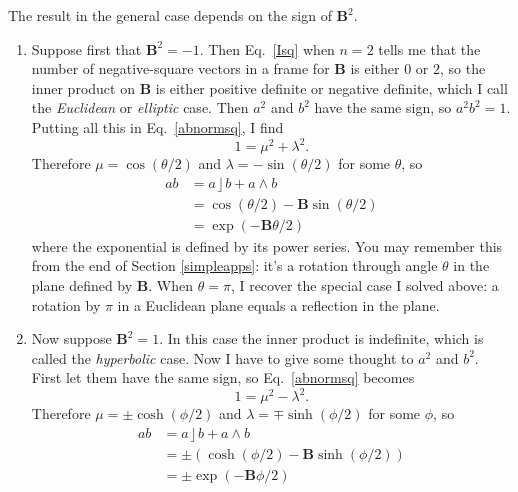 \documentclass{utarticle}
\newcommand{\bl}[1]{\ensuremath{\bm{#1}}}
\DeclareMathOperator{\lin}{\rfloor}
\DeclareMathOperator{\out}{\wedge}
\begin{document}
The result in the general case depends on the sign of $\bl{B}^2$.
\begin{enumerate}
\item Suppose first that $\bl{B}^2=-1$.  Then Eq.~\eqref{Isq} when $n=2$ tells me that the number of 
          negative-square vectors in a frame for \bl{B} is either $0$ or $2$, so the inner product on \bl{B} 
          is either positive definite or negative definite, which I call the \emph{Euclidean} or \emph{elliptic} 
          case.  Then $a^2$ and $b^2$ have the same sign, so $a^2b^2 = 1$.  Putting all this in 
          Eq.~\eqref{abnormsq}, I find
          \begin{equation} 1 = \mu^2 + \lambda^2. \end{equation}
          Therefore $\mu = \cos(\theta/2)$ and $\lambda = -\sin(\theta/2)$ for some $\theta$, so 
          \begin{align} 
          ab & = a \lin b + a \out b \nonumber \\
                & = \cos(\theta/2) - \bl{B} \sin(\theta/2) \nonumber \\
                & = \exp\left(-\bl{B} \theta/2\right)
          \label{definiterotor}
          \end{align}
          where the exponential is defined by its power series.  You may remember this from the end of Section 
          \ref{simpleapps}: it's a rotation through angle $\theta$ in the plane defined by \bl{B}.  When $\theta = \pi$, 
          I recover the special case I solved above: a rotation by $\pi$ in a Euclidean plane equals a reflection 
          in the plane.
\item Now suppose $\bl{B}^2 = 1$.  In this case the inner product is indefinite, which is called the \emph{hyperbolic} 
          case.  Now I have to give some thought to $a^2$ and $b^2$.  First let them have the same sign, 
          so Eq.~\eqref{abnormsq} becomes
          \begin{equation} 1 = \mu^2 - \lambda^2. \end{equation}
          Therefore $\mu = \pm\cosh(\phi/2)$ and $\lambda = \mp\sinh(\phi/2)$ for some $\phi$, so 
          \begin{align} 
          ab & = a \lin b + a \out b \nonumber \\
                & = \pm\left(\cosh(\phi/2) - \bl{B} \sinh(\phi/2)\right) \nonumber \\
                & = \pm\exp\left(-\bl{B} \phi/2\right)
          \end{align}

\end{enumerate}
\end{document}

